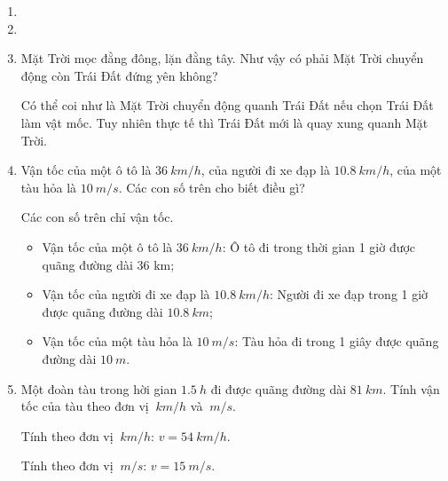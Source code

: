 \begin{enumerate}[label=\bfseries Câu \arabic*:]
	\item {}
	
	
	
	\item {}
	
	
	\item {}
	
	\cauhoi
	{Mặt Trời mọc đằng đông, lặn đằng tây. Như vậy có phải Mặt Trời chuyển động còn Trái Đất đứng yên không?
	}
	
	\loigiai
	{Có thể coi như là Mặt Trời chuyển động quanh Trái Đất nếu chọn Trái Đất làm vật mốc. Tuy nhiên thực tế thì Trái Đất mới là quay xung quanh Mặt Trời.
	}
	\item {}
	
	\cauhoi
	{Vận tốc của một ô tô là $\SI{36}{km/h}$, của người đi xe đạp là $\SI{10.8}{km/h}$, của một tàu hỏa là $\SI{10}{m/s}$. Các con số trên cho biết điều gì?
	}
	
	\loigiai
	{Các con số trên chỉ vận tốc.
		\begin{itemize}
			\item Vận tốc của một ô tô là $\SI{36}{km/h}$: Ô tô đi trong thời gian 1 giờ được quãng đường dài 36 km;
			\item Vận tốc của người đi xe đạp là $\SI{10.8}{km/h}$: Người đi xe đạp trong 1 giờ được quãng đường dài $\SI{10.8}{km}$;
			\item Vận tốc của một tàu hỏa là $\SI{10}{m/s}$: Tàu hỏa đi trong 1 giây được quãng đường dài $\SI{10}{m}$.
		\end{itemize}
	}
	\item {}
	
	\cauhoi
	{Một đoàn tàu trong hời gian $\SI{1.5}{h}$ đi được quãng đường dài $\SI{81}{km}$. Tính vận tốc của tàu theo đơn vị $\SI{}{km/h}$ và $\SI{}{m/s}$.
	}
	
	\loigiai
	{
	Tính theo đơn vị $\SI{}{km/h}$: $v=\SI{54}{km/h}$.
	
	Tính theo đơn vị $\SI{}{m/s}$: $v=\SI{15}{m/s}$.
	}
\end{enumerate}